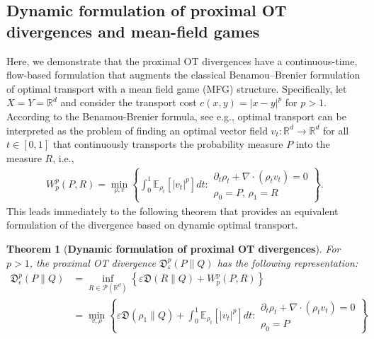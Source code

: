 \documentclass{amsart}
\newcommand{\MK}[1]{\textcolor{orange}{MK: #1}}
\newcommand{\rb}[1]{#1} %
\newcommand{\R}{\mathbb{R}}
\newtheorem{theorem}{Theorem}[section]
\theoremstyle{definition}
\theoremstyle{remark}
\numberwithin{equation}{section}
\begin{document}



\subsection{Dynamic formulation of proximal OT divergences and mean-field games}\label{subsec:DF.pOTd}

Here, we demonstrate that the proximal OT divergences have a continuous-time, flow-based formulation that augments the classical Benamou–Brenier formulation of optimal transport \cite{Benamou2000} with a mean field game (MFG) structure. Specifically, let $X=Y=\mathbb{R}^d$ and consider the transport cost  $c(x,y)=|x-y|^p$ for $p>1$. %
According to the Benamou-Brenier formula, see e.g.\thinspace\cite{Santambrogio}, optimal transport can be interpreted as the problem of finding an optimal vector field $v_t : \mathbb{R}^d \rightarrow \mathbb{R}^d$ \rb{for all $t \in [0,1]$} 
that continuously transports the probability measure $P$ into the measure $R$, i.e., 
\begin{align}
    W_p^p(P,R) = \min_{\rho, v} \left\{ \int_0^1 \mathbb{E}_{\rho_t}\left[|v_t|^p\right] d t : \begin{array}{c}\partial_t\rho_t + \nabla \cdot(\rho_t v_t) = 0 \\ \rho_0 = P,\, \rho_1 = R  \end{array}
    \right\}.
\end{align}
This leads immediately to the following theorem that provides an equivalent formulation of the divergence based on dynamic optimal transport. 
\begin{theorem}[\bf Dynamic formulation of proximal OT divergences]\label{thm:dynamic:pot}
    For $p>1$, the proximal OT divergence  $\mathfrak{D}^p_\varepsilon(P\|Q)$
    has the following representation:
\begin{align}
    \mathfrak{D}^p_\epsilon(P\|Q) &=  \inf_{R\in \mathcal{P}(\R^d)}\left\{ \varepsilon \mathfrak{D}(R\|Q) + W_p^p(P,R) \right\} \nonumber \\
    & = \min_{v,\rho} \left\{ \varepsilon \mathfrak{D} (\rho_1\|Q) + \int_0^1 \mathbb{E}_{\rho_t}\left[|v_t|^p\right] dt : 
    \begin{array}{c}
    \partial_t \rho_t + \nabla \cdot(\rho_t v_t) = 0 \\  
    \rho_0 = P
     \end{array}\right\} \label{eq:dynamic:pot}
\end{align}
\end{theorem}
\end{document}
